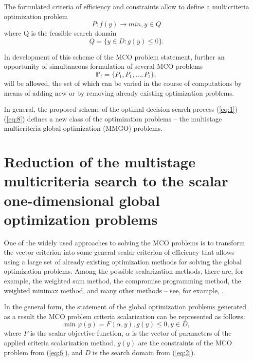 \documentclass[runningheads]{llncs}
\begin{document}
The formulated criteria of efficiency and constraints allow to define a multicriteria optimization problem
\begin{equation}\label{eq:6}
	P : f(y)\to min, y \in Q
\end{equation}
where Q is the feasible search domain
\begin{equation}\label{eq:7}
	Q=\{ y\in D : g(y) \leq 0 \}.
\end{equation}

In development of this scheme of the MCO problem statement, further an opportunity of simultaneous formulation of several MCO problems 
\begin{equation}\label{eq:8}
	\mathbb{P}_t=\{ P_1,P_1,\dots,P_t \},
\end{equation}
will be allowed, the set of which can be varied in the course of computations by means of adding new or by removing already existing optimization problems. 

In general, the proposed scheme of the optimal decision search process (\ref{eq:1})-(\ref{eq:8}) defines a new class of the optimization problems -- the multistage multicriteria global optimization (MMGO) problems.

\section{Reduction of the multistage multicriteria search to the scalar one-dimensional global optimization problems}	
\label{sec:03}
One of the widely used approaches to solving the MCO problems is to transform the vector criterion into some general scalar criterion of efficiency that allows using a large set of already existing optimization methods for solving the global optimization problems. Among the possible scalarization methods, there are, for example, the weighted sum method, the compromise programming method, the weighted minimax method, and many other methods -- see, for example, \cite{c2,c3}. 

In the general form, the statement of the global optimization problems generated as a result the MCO problem criteria scalarization can be represented as follows:
\begin{equation}\label{eq:9}
	\min{\varphi(y) = F(\alpha,y)}, g(y) \leq 0, y \in D,
\end{equation}
where $F$ is the scalar objective function, $\alpha$ is the vector of parameters of the applied criteria scalarization method, $g(y)$ are the constraints of the MCO problem from (\ref{eq:6}), and $D$ is the search domain from (\ref{eq:2}).
\end{document}
